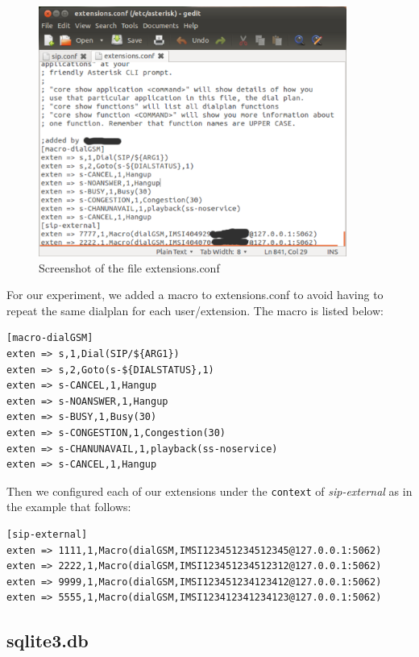 \begin{figure}
  \centering
    \includegraphics[width=0.9\textwidth]{../images/ext_conf}
  \caption[Screenshot - extensions.conf]{Screenshot of the file \textsf{extensions.conf}}
  \label{ext_conf}
\end{figure}
For our experiment, we added a macro to \textsf{extensions.conf} to avoid
having to repeat the same dialplan for each user/extension. The macro is
listed below:
\begin{verbatim}
[macro-dialGSM]
exten => s,1,Dial(SIP/${ARG1})
exten => s,2,Goto(s-${DIALSTATUS},1)
exten => s-CANCEL,1,Hangup
exten => s-NOANSWER,1,Hangup
exten => s-BUSY,1,Busy(30)
exten => s-CONGESTION,1,Congestion(30)
exten => s-CHANUNAVAIL,1,playback(ss-noservice)
exten => s-CANCEL,1,Hangup
\end{verbatim}

Then we configured each of our extensions under the \texttt{context} of 
\textsl{sip-external} as in the example that follows: 
\begin{verbatim}
[sip-external]
exten => 1111,1,Macro(dialGSM,IMSI123451234512345@127.0.0.1:5062)
exten => 2222,1,Macro(dialGSM,IMSI123451234512312@127.0.0.1:5062)
exten => 9999,1,Macro(dialGSM,IMSI123451234123412@127.0.0.1:5062)
exten => 5555,1,Macro(dialGSM,IMSI123412341234123@127.0.0.1:5062)   
\end{verbatim}


\subsection{sqlite3.db}

